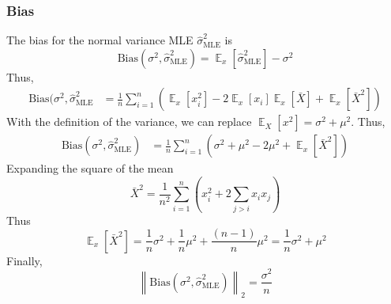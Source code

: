 \documentclass{article}
\DeclareMathOperator{\E}{\mathbb{E}}
\numberwithin{equation}{section}
\newcommand{\norm}[1]{\left\lVert#1\right\rVert_2}
\newcommand{\mle}[1]{\hat{#1}_{\text{MLE}}}
\begin{document}
\subsubsection{Bias}
The bias for the normal variance MLE $\mle{\sigma}^2$ is
 \[
         \text{Bias}(\sigma^2, \mle{\sigma}^2) = \E_x[\mle{\sigma}^2] - \sigma^2 
\]
Thus,
\begin{align*}
        \text{Bias}(\sigma^2, \mle{\sigma}^2 &= 
        \frac{1}{n}\sum_{i = 1}^n (\E_x[x_i^2] - 2 \E_x[x_i]\E_x[\bar{X}] + \E_x[\bar{X}^2])
\end{align*} 
With the definition of the variance, we can replace $\E_X[x^2] = \sigma^2 + \mu^2$.
Thus,
 \begin{align*}
         \text{Bias}(\sigma^2, \mle{\sigma}^2) &= 
        \frac{1}{n}\sum_{i = 1}^n (\sigma^2 + \mu^2 - 2 \mu^2 + \E_x[\bar{X}^2])
\end{align*} 
Expanding the square of the mean
\[
\bar{X}^2 = \frac{1}{n^2}\sum_{i = 1}^n
\left(  x_i^2 + 2\sum_{j > i}x_ix_j
\right)
\]
Thus
\[
        \E_x[\bar{X}^2] = \frac{1}{n}\sigma^2 + \frac{1}{n}\mu^2 + \frac{(n - 1)}{n}\mu^2 =
                \frac{1}{n}\sigma^2 + \mu^2
\]
Finally,
\[
        \norm{\text{Bias}(\sigma^2, \mle{\sigma}^2)} = \frac{\sigma^2}{n} 
\]
\end{document}
